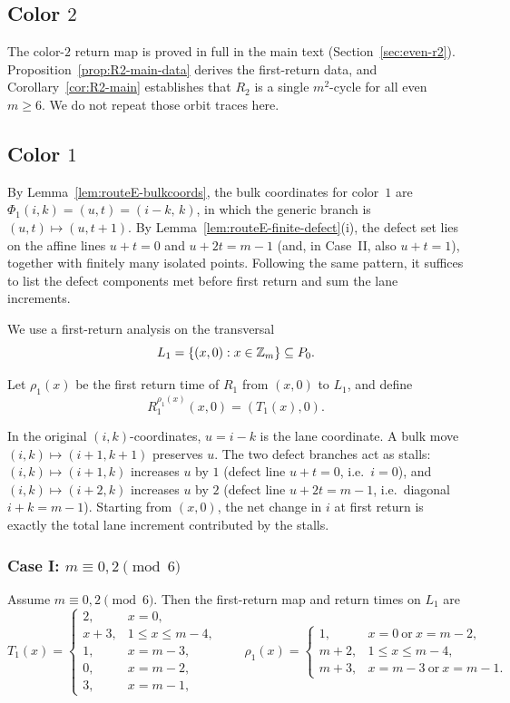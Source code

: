 \subsection{Color $2$}

The color-$2$ return map is proved in full in the main text (Section~\ref{sec:even-r2}).
Proposition~\ref{prop:R2-main-data} derives the first-return data, and Corollary~\ref{cor:R2-main} establishes that $R_2$ is a single $m^2$-cycle for all even $m\ge 6$.
We do not repeat those orbit traces here.


\subsection{Color $1$}

By Lemma~\ref{lem:routeE-bulkcoords}, the bulk coordinates for color~$1$ are $\Phi_1(i,k)=(u,t)=(i-k,\,k)$, in which the generic branch is $(u,t)\mapsto(u,t+1)$.
By Lemma~\ref{lem:routeE-finite-defect}\textup{(i)}, the defect set lies on the affine lines $u+t=0$ and $u+2t=m-1$ (and, in Case~II, also $u+t=1$), together with finitely many isolated points.
Following the same pattern, it suffices to list the defect components met before first return and sum the lane increments.

We use a first-return analysis on the transversal
\[
L_1=\{(x,0):x\in \mathbb Z_m\}\subseteq P_0.
\]

Let $\rho_1(x)$ be the first return time of $R_1$ from $(x,0)$ to $L_1$, and define
\[
R_1^{\rho_1(x)}(x,0)=(T_1(x),0).
\]

In the original $(i,k)$-coordinates, $u=i-k$ is the lane coordinate.
A bulk move $(i,k)\mapsto(i+1,k+1)$ preserves $u$.
The two defect branches act as stalls: $(i,k)\mapsto(i+1,k)$ increases $u$ by $1$ (defect line $u+t=0$, i.e.\ $i=0$), and $(i,k)\mapsto(i+2,k)$ increases $u$ by $2$ (defect line $u+2t=m-1$, i.e.\ diagonal $i+k=m-1$).
Starting from $(x,0)$, the net change in $i$ at first return is exactly the total lane increment contributed by the stalls.

\subsubsection{Case I: $m\equiv 0,2\pmod 6$}

\begin{proposition}\label{prop:R1-caseI}
Assume $m\equiv 0,2\pmod 6$.
Then the first-return map and return times on $L_1$ are
\[
T_1(x)=
\begin{cases}
2,&x=0,\\
x+3,&1\le x\le m-4,\\
1,&x=m-3,\\
0,&x=m-2,\\
3,&x=m-1,
\end{cases}
\qquad
\rho_1(x)=
\begin{cases}
1,&x=0\ \text{or}\ x=m-2,\\
m+2,&1\le x\le m-4,\\
m+3,&x=m-3\ \text{or}\ x=m-1.
\end{cases}
\]
\end{proposition}

